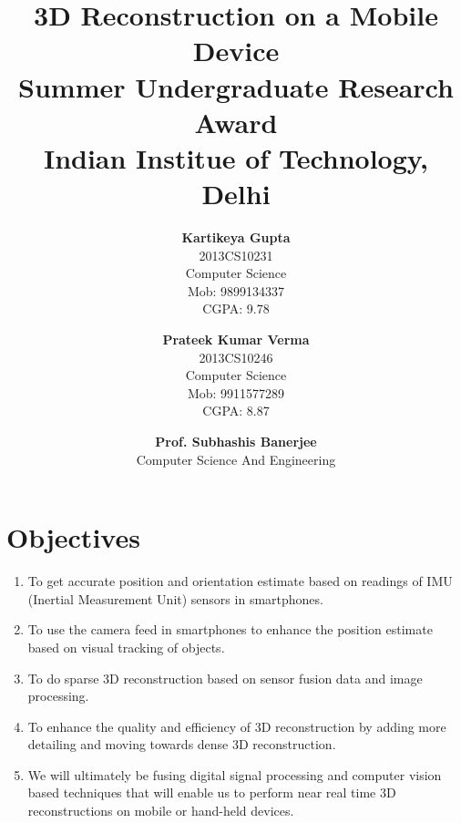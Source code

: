 \documentclass{article}
\title{\vspace*{\fill} \textbf{3D Reconstruction on a Mobile Device}
	  \\ {\large \textbf{Summer Undergraduate Research Award}}
	  \\ {\large \textbf{Indian Institue of Technology, Delhi}}}
\author{
	\textbf{Kartikeya Gupta}\\ 
	2013CS10231\\
	Computer Science\\
	Mob: 9899134337\\
	CGPA: 9.78
	\and
	\textbf{Prateek Kumar Verma}\\ 
	2013CS10246\\
	Computer Science\\
	Mob: 9911577289\\
	CGPA: 8.87
}
\date{\textbf{Prof. Subhashis Banerjee} \\ Computer Science And Engineering \vspace*{\fill}}
\begin{document}
	\maketitle

	\newpage
	\section{Objectives}
		\begin{enumerate}
			\item 
				To get accurate position and orientation estimate based on readings of IMU (Inertial Measurement Unit) sensors in smartphones. 
			\item
				To use the camera feed in smartphones to enhance the position estimate based on visual tracking of objects.
			\item 
				To do sparse 3D reconstruction based on sensor fusion data and image processing.
			\item
				To enhance the quality and efficiency of 3D reconstruction by adding more detailing and moving towards dense 3D reconstruction.
			\item
				We will ultimately be fusing digital signal processing and computer vision based techniques that will enable us to perform near real time 3D reconstructions on mobile or hand-held devices.
		\end{enumerate}
\end{document}
